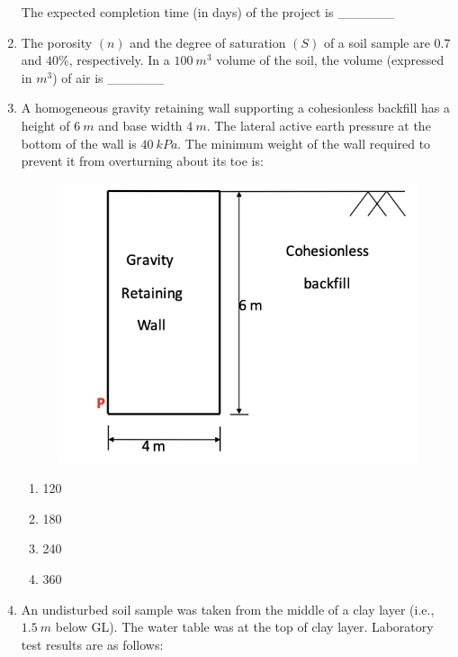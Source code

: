\documentclass[journal]{IEEEtran}
\begin{document}
\begin{enumerate}[resume]
The expected completion time (in days) of the project is \_\_\_\_\_\_ \hfill {}

\item The porosity $(n)$ and the degree of saturation $(S)$ of a soil sample are $0.7$ and $40\%$, respectively. In a $100 \ m^3$ volume of the soil, the volume (expressed in $m^3$) of air is \_\_\_\_\_\_ \hfill {}

\item A homogeneous gravity retaining wall supporting a cohesionless backfill has a height of $6 \ m$ and base width $4 \ m$. The lateral active earth pressure at the bottom of the wall is $40 \ kPa$. The minimum weight of the wall  required to prevent it from overturning about its toe  is:  \hfill {}

\begin{figure}[H]
    \centering
    \includegraphics[width=0.6\columnwidth]{figs/Q51.png} 
    \caption{}
    \label{fig:placeholder}
\end{figure}
\begin{enumerate}
    \item 120
    \item 180
    \item 240
    \item 360
\end{enumerate}

\item An undisturbed soil sample was taken from the middle of a clay layer (i.e., $1.5 \ m$ below GL). The water table was at the top of clay layer. Laboratory test results are as follows:  \hfill {}




\end{enumerate}
\end{document}
